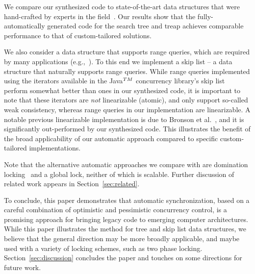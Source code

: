 We compare our synthesized code to state-of-the-art data structures
that were hand-crafted by experts in the field~\cite{DrachslerVY2014,BronsonCCO2010,ConcurrentSkipList,fraser2004practical}.
Our results show that the
fully-automatically generated code for the search tree and treap
achieves comparable performance to that of
custom-tailored solutions.

We also consider a data structure that supports range queries, which are required by
many applications (e.g.,~\cite{levelDB,FerroJKRY14}). To this end we implement a skip list -- a data structure that naturally supports range queries.
While range queries implemented using the iterators available in the Java$^{\sc TM}$ concurrency library's skip list~\cite{ConcurrentSkipList} perform
somewhat better than ones in our synthesized code, it is important to note that these iterators are \emph{not}
linearizable (atomic), and only support so-called weak consistency, whereas range queries in our implementation are linearizable.
A notable previous linearizable implementation is due to Bronson et al.~\cite{BronsonCCO2010},
and it is significantly out-performed by our synthesized code. 
%
This illustrates the benefit of the broad applicability
of our automatic approach compared to specific custom-tailored implementations.

Note that the alternative automatic approaches we compare with are domination locking~\cite{Gueta2011} and a global lock, neither of which is scalable.
Further discussion of related work appears in Section~\ref{sec:related}.

To conclude, this paper demonstrates that automatic synchronization, based on a careful combination of optimistic and
pessimistic concurrency control, is a promising approach for bringing legacy code to emerging computer architectures.
While this paper illustrates the method for tree and skip list data structures, we believe that the general direction may be more broadly applicable, and maybe used with a variety of locking schemes, such as two phase locking.
Section~\ref{sec:discussion} concludes the paper and touches on some directions for future work. 